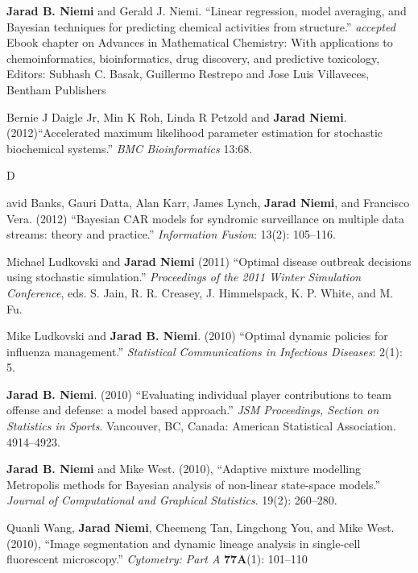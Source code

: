 \documentclass[overlapped,line,letterpaper]{res}
\begin{document}
\begin{resume}
{\bf Jarad B. Niemi} and Gerald J. Niemi. ``Linear regression, model averaging, and Bayesian techniques for predicting chemical activities from structure.'' \emph{accepted} Ebook chapter on Advances in Mathematical Chemistry: With applications to chemoinformatics, bioinformatics, drug discovery, and predictive toxicology, Editors: Subhash C. Basak, Guillermo Restrepo and Jose Luis Villaveces, Bentham Publishers

Bernie J Daigle Jr, Min K Roh, Linda R Petzold and {\bf Jarad Niemi}. (2012)``Accelerated maximum likelihood parameter estimation for stochastic biochemical systems.'' \emph{BMC Bioinformatics} 13:68.

\newpage \opening
David Banks, Gauri Datta, Alan Karr, James Lynch, {\bf Jarad Niemi}, and Francisco Vera. (2012) ``Bayesian CAR models for syndromic surveillance on multiple data streams: theory and practice.'' \emph{Information Fusion}: 13(2): 105--116.


Michael Ludkovski and {\bf Jarad Niemi} (2011) ``Optimal disease outbreak decisions using stochastic simulation.'' \emph{Proceedings of the 2011 Winter Simulation Conference}, eds. S. Jain, R. R. Creasey, J. Himmelspack, K. P. White, and M. Fu.

Mike Ludkovski and {\bf Jarad B. Niemi}. (2010) ``Optimal dynamic policies for influenza management.'' \emph{Statistical Communications in Infectious Diseases}: 2(1): 5.

{\bf Jarad B. Niemi}. (2010) ``Evaluating individual player contributions to team offense and defense: a model based approach.'' \emph{JSM Proceedings, Section on Statistics in Sports}. Vancouver, BC, Canada: American Statistical Association. 4914--4923.


{\bf Jarad B. Niemi} and Mike West. (2010), ``Adaptive mixture modelling Metropolis methods for Bayesian analysis of non-linear state-space models.'' \emph{Journal of Computational and Graphical Statistics}. 19(2): 260--280.

Quanli Wang, {\bf Jarad Niemi}, Cheemeng Tan, Lingchong You, and Mike West. (2010), ``Image segmentation and dynamic lineage analysis in single-cell fluorescent microscopy.'' \emph{Cytometry: Part A} {\bf 77A}(1): 101--110


\end{resume}
\end{document}

